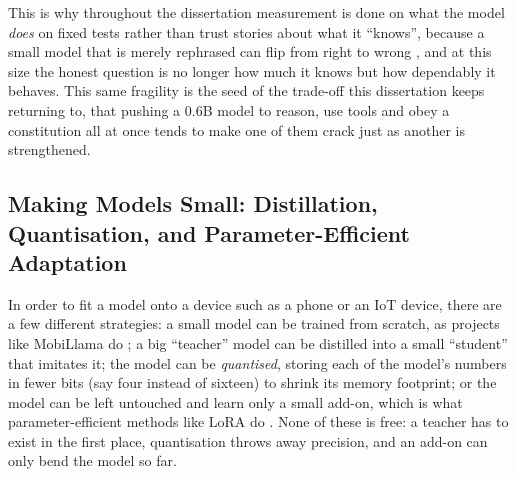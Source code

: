 This is why throughout the dissertation measurement is done on what the model \emph{does} on fixed tests rather than trust stories about what it ``knows'', because a small model that is merely rephrased can flip from right to wrong \cite{salido2025othersgeneraltechniquedistinguish}, and at this size the honest question is no longer how much it knows but how dependably it behaves. This same fragility is the seed of the trade-off this dissertation keeps returning to, that pushing a 0.6B model to reason, use tools and obey a constitution all at once tends to make one of them crack just as another is strengthened.


\subsection{Making Models Small: Distillation, Quantisation, and Parameter-Efficient Adaptation}
\label{subsec:making-models-small}

In order to fit a model onto a device such as a phone or an IoT device, there are a few different strategies: a small model can be trained from scratch, as projects like MobiLlama do \cite{thawakar2024mobillamaaccuratelightweightfully}; a big ``teacher'' model can be distilled into a small ``student'' that imitates it; the model can be \emph{quantised}, storing each of the model's numbers in fewer bits (say four instead of sixteen) to shrink its memory footprint; or the model can be left untouched and learn only a small add-on, which is what parameter-efficient methods like LoRA do \cite{hu2021loralowrankadaptationlarge}. None of these is free: a teacher has to exist in the first place, quantisation throws away precision, and an add-on can only bend the model so far.

